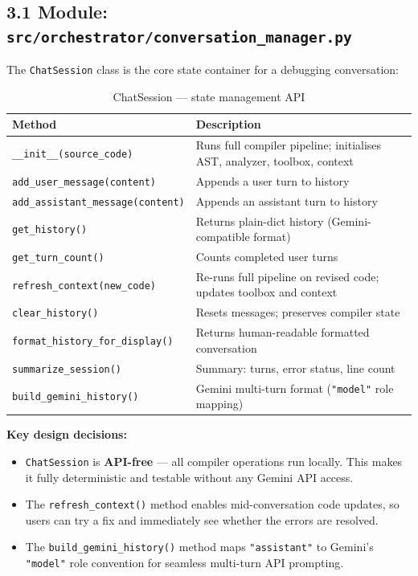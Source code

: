 \documentclass[a4paper,11pt]{article}
\begin{document}
\subsection{3.1 Module: \texttt{src/orchestrator/conversation\_manager.py}}

The \texttt{ChatSession} class is the core state container for a debugging conversation:

\begin{table}[h]
\centering
\begin{tabularx}{\textwidth}{|l|X|}
\hline
\rowcolor{blue!10}
\textbf{Method} & \textbf{Description} \\
\hline
\texttt{\_\_init\_\_(source\_code)} & Runs full compiler pipeline; initialises AST, analyzer, toolbox, context \\
\hline
\texttt{add\_user\_message(content)} & Appends a user turn to history \\
\hline
\texttt{add\_assistant\_message(content)} & Appends an assistant turn to history \\
\hline
\texttt{get\_history()} & Returns plain-dict history (Gemini-compatible format) \\
\hline
\texttt{get\_turn\_count()} & Counts completed user turns \\
\hline
\texttt{refresh\_context(new\_code)} & Re-runs full pipeline on revised code; updates toolbox and context \\
\hline
\texttt{clear\_history()} & Resets messages; preserves compiler state \\
\hline
\texttt{format\_history\_for\_display()} & Returns human-readable formatted conversation \\
\hline
\texttt{summarize\_session()} & Summary: turns, error status, line count \\
\hline
\texttt{build\_gemini\_history()} & Gemini multi-turn format (\texttt{"model"} role mapping) \\
\hline
\end{tabularx}
\caption{ChatSession --- state management API}
\end{table}

\textbf{Key design decisions:}
\begin{itemize}
    \item \texttt{ChatSession} is \textbf{API-free} --- all compiler operations run locally. This makes it fully deterministic and testable without any Gemini API access.
    \item The \texttt{refresh\_context()} method enables mid-conversation code updates, so users can try a fix and immediately see whether the errors are resolved.
    \item The \texttt{build\_gemini\_history()} method maps \texttt{"assistant"} to Gemini's \texttt{"model"} role convention for seamless multi-turn API prompting.
\end{itemize}
\end{document}
